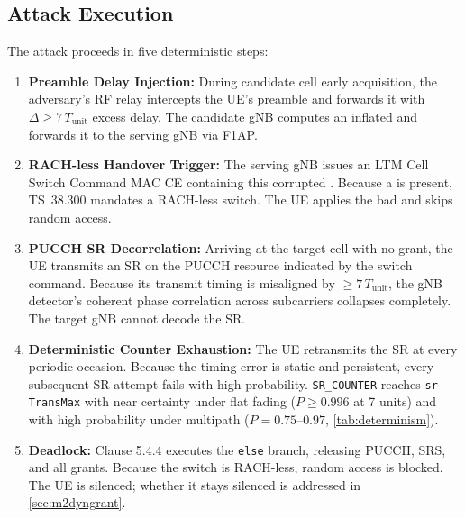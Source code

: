 \subsection{Attack Execution}
The attack proceeds in five deterministic steps:
\begin{enumerate}\itemsep2pt
  \item \textbf{Preamble Delay Injection:} During candidate cell early acquisition, the adversary's RF
        relay intercepts the UE's preamble and forwards it with $\Delta \ge 7\,T_{\mathrm{unit}}$ excess
        delay. The candidate gNB computes an inflated \TA{} and forwards it to the serving gNB via F1AP.
  \item \textbf{RACH-less Handover Trigger:} The serving gNB issues an LTM Cell Switch Command MAC CE
        containing this corrupted \TA{}. Because a \TA{} is present, TS~38.300 mandates a RACH-less switch.
        The UE applies the bad \TA{} and skips random access.
  \item \textbf{PUCCH SR Decorrelation:} Arriving at the target cell with no grant, the UE transmits an
        SR on the PUCCH resource indicated by the switch command. Because its transmit timing is
        misaligned by $\ge 7\,T_{\mathrm{unit}}$, the gNB detector's coherent phase correlation across
        subcarriers collapses completely. The target gNB cannot decode the SR.
  \item \textbf{Deterministic Counter Exhaustion:} The UE retransmits the SR at every periodic occasion.
        Because the timing error is static and persistent, every subsequent SR attempt fails with high
        probability. \texttt{SR\_COUNTER} reaches \texttt{sr-TransMax} with near certainty under flat
        fading ($P \ge 0.996$ at 7 units) and with high probability under multipath ($P = 0.75$--$0.97$,
        \cref{tab:determinism}).
  \item \textbf{Deadlock:} Clause 5.4.4 executes the \texttt{else} branch, releasing PUCCH, SRS, and all
        grants. Because the switch is RACH-less, random access is blocked. The UE is silenced; whether it
        stays silenced is addressed in \cref{sec:m2dyngrant}.
\end{enumerate}

